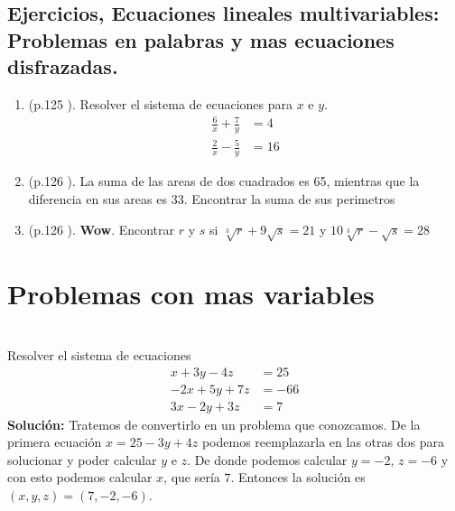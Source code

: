 \newpage
\begin{center}
	\vspace{-1cm}
	\subsection*{Ejercicios, Ecuaciones lineales multivariables: Problemas en palabras y mas ecuaciones disfrazadas.}\label{ejercicios:part:algebra:chapter:problemasEnPalabrasyEcuacionesDisfrazadas}
\end{center}	
\begin{enumerate}
	\item (p.125 \cite{Aops_algebra}). Resolver el sistema de ecuaciones para $x$ e $y$.
	\begin{align*}
	\frac{6}{x} + \frac{7}{y} &= 4\\
	\frac{2}{x} -  \frac{5}{y} &= 16
	\end{align*}
	\item (p.126 \cite{Aops_algebra}). La suma de las areas de dos cuadrados es 65, mientras que la diferencia en sus areas es 33. Encontrar la suma de sus perimetros
	
	\item (p.126 \cite{Aops_algebra}). \textbf{Wow}. Encontrar $r$ y $s$ si $\sqrt[3]{r}+ 9\sqrt{s} =21$ y $10 \sqrt[3]{r} - \sqrt{s} =28$
	
\end{enumerate}
\newpage


\section{Problemas con mas variables }\label{section:problemas_con_mas_variables}

\begin{ejemplo}{\ \\}
	Resolver el sistema de ecuaciones
	\begin{align*}
	x+3y-4z &= 25\\
	-2x+5y+7z &= -66\\
	3x-2y+3z &= 7
	\end{align*}
	\textbf{Solución: }Tratemos de convertirlo en un problema que conozcamos. De la primera ecuación $x=25-3y+4z$ podemos reemplazarla en las otras dos para solucionar y poder calcular $y$ e $z$. De donde podemos calcular $y=-2$, $z=-6$ y con esto podemos calcular $x$, que sería $7$. Entonces la solución es $(x,y,z) = (7,-2,-6)$.
\end{ejemplo}

